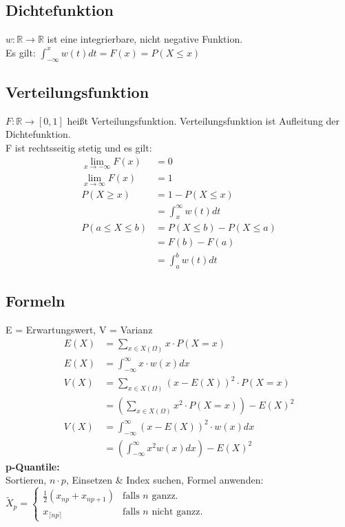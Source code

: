 \documentclass[a4paper, landscape, 10pt]{article}
\newcommand{\limFromTo}[2]{ \lim\limits_{#2 \rightarrow #1}}
\begin{document}
\begin{multicols}{5}
\begin{small}
	    \subsection{Dichtefunktion}
	    	$w: \mathbb{R} \rightarrow \mathbb{R}$ ist eine integrierbare, nicht negative Funktion. \\
	    	Es gilt: $\int_{-\infty}^{x} w(t) dt = F(x) = P(X \leq x)$
	    \subsection{Verteilungsfunktion}
	    	$F: \mathbb{R} \rightarrow \left[0,1\right]$ heißt Verteilungsfunktion. Verteilungsfunktion ist Aufleitung der Dichtefunktion.\\
	    	F ist rechtsseitig stetig und es gilt:
	    	\begin{align*}
	    		\limFromTo{-\infty}{x} F(x) &= 0\\
	    		\limFromTo{\infty}{x} F(x) &= 1\\
	    		P(X \geq x) &= 1 - P(X \leq x) \\
	    					&= \int_{x}^{\infty} w(t)dt\\
	    		P(a \le X \le b) &= P(X \le b) - P(X \le a)\\
	    						 &= F(b) - F(a) \\
	    						 &= \int_{a}^{b} w(t)dt
	    	\end{align*}
	    \subsection{Formeln}
	    E = Erwartungswert, V = Varianz
		    \begin{align*}
		    	E(X) &= \sum_{x \in X(\Omega)} x \cdot P(X = x)\\
		    	E(X) &= \int_{-\infty}^{\infty} x \cdot w(x) dx\\
		    	V(X) &= \sum_{x \in X(\Omega)} (x - E(X))^2 \cdot P(X = x)\\
		    		 &= \left(\sum_{x \in X(\Omega)} x^2 \cdot P(X = x)\right) - E(X)^2\\
		    	V(X) &= \int_{-\infty}^{\infty} (x - E(X))^2 \cdot w(x) dx\\
		    		 &= \left(\int_{-\infty}^{\infty} x^2 w(x) dx \right) - E(X)^2	 
		    \end{align*}
		    \textbf{p-Quantile:}\\
		    Sortieren, $n\cdot p$, Einsetzen \& Index suchen, Formel anwenden:\\
			$\widetilde{X}_p=
			\begin{cases}
			\frac{1}{2}(x_{np}+x_{np+1}) & \text{falls } n \text{ ganzz.}\\
			x_{\lceil{np}\rceil} & \text{falls } n \text{ nicht ganzz.}
			\end{cases}$
			

\end{small}
\end{multicols}
\end{document}
